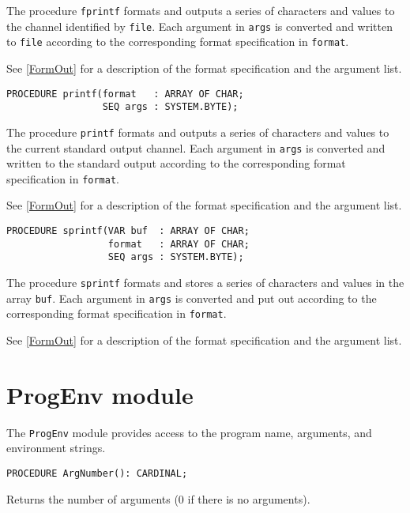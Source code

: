 The procedure {\tt fprintf} formats and outputs a series of characters and
values to the channel identified by {\tt file}. Each argument in {\tt args}
is converted and written to {\tt file} according to the corresponding format
specification in {\tt format}.

See \ref{FormOut} for a description of the format specification and the
argument list.


{\samepage
{}
\begin{verbatim}
PROCEDURE printf(format   : ARRAY OF CHAR;
                 SEQ args : SYSTEM.BYTE);
\end{verbatim}
}
\ModuleList

The procedure {\tt printf} formats and outputs a series of characters and
values to the current standard output channel. Each argument in {\tt args}
is converted and written to the standard output according to the corresponding
format specification in {\tt format}.

See \ref{FormOut} for a description of the format specification and the
argument list.

{\samepage
{}
\begin{verbatim}
PROCEDURE sprintf(VAR buf  : ARRAY OF CHAR;
                  format   : ARRAY OF CHAR;
                  SEQ args : SYSTEM.BYTE);
\end{verbatim}
}
\ModuleList

The procedure {\tt sprintf} formats and stores a series of characters and
values in the array {\tt buf}. Each argument in {\tt args}
is converted and put out according to the corresponding format
specification in {\tt format}.

See \ref{FormOut} for a description of the format specification and the
argument list.

\section{ProgEnv module}
\renewcommand{\ModuleI}{ProgEnv}
\OneModule

The {\tt ProgEnv} module provides access to the program
name, arguments, and environment strings.

{\samepage
{}
\begin{verbatim}
PROCEDURE ArgNumber(): CARDINAL;
\end{verbatim}
}
\ModuleList
Returns the number of arguments (0 if there is no arguments).

